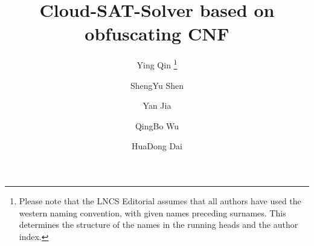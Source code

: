 \documentclass[runningheads,a4paper]{llncs}
\begin{document}
\mainmatter  %

\title{Cloud-SAT-Solver based on obfuscating CNF}


%
%
\author{Ying Qin%
\thanks{Please note that the LNCS Editorial assumes that all authors have used
the western naming convention, with given names preceding surnames. This determines
the structure of the names in the running heads and the author index.}%
\and ShengYu Shen\and Yan Jia\and QingBo Wu\and HuaDong Dai}
%


%
%

\maketitle
\end{document}
